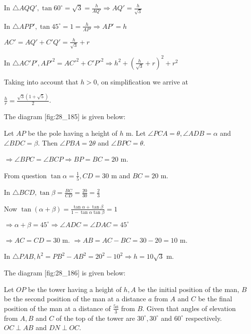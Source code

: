   In $\triangle AQQ', \tan60^\circ = \sqrt{3} = \frac{h}{AQ'} \Rightarrow AQ' = \frac{h}{\sqrt{3}}$

  In $\triangle APP', \tan45^\circ = 1 = \frac{h}{AP'} \Rightarrow AP' = h$

  $AC' = AQ' + C'Q' = \frac{h}{\sqrt{3}} + r$

  In $\triangle AC'P', AP'^2 = AC'^2 + C'P'^2 \Rightarrow h^2 + \left(\frac{h}{\sqrt{3}} +
  r\right)^2 + r^2$

  Taking into account that $h > 0$, on simplification we arrive at

  $\frac{h}{r} = \frac{\sqrt{3}(1 + \sqrt{5})}{2}$.

\item The diagram [fig:28_185] is given below:

  \startplacefigure[reference=fig:28_185]
    \externalfigure[28_185.pdf]
  \stopplacefigure

  Let $AP$ be the pole having a height of $h$ m. Let $\angle PCA = \theta, \angle ADB =
  \alpha$ and $\angle BDC = \beta$. Then $\angle PBA = 2\theta$ and $\angle BPC =
  \theta$.

  $\Rightarrow \angle BPC = \angle BCP \Rightarrow BP = BC = 20$ m.

  From question $\tan\alpha = \frac{1}{5}, CD = 30$ m and $BC = 20$ m.

  In $\triangle BCD, \tan\beta = \frac{BC}{CD} = \frac{20}{30} = \frac{2}{3}$

  Now $\tan(\alpha + \beta) = \frac{\tan\alpha + \tan\beta}{1 - \tan\alpha\tan\beta} = 1$

  $\Rightarrow \alpha + \beta = 45^\circ \Rightarrow \angle ADC = \angle DAC = 45^\circ$

  $\Rightarrow AC = CD = 30$ m. $\Rightarrow AB = AC - BC = 30 - 20 = 10$ m.

  In $\triangle PAB, h^2 = PB^2 - AB^2 = 20^2 - 10^2 \Rightarrow h = 10\sqrt{3}$ m.

\item The diagram [fig:28_186] is given below:

  \startplacefigure[reference=fig:28_186]
    \externalfigure[28_186.pdf]
  \stopplacefigure

  Let $OP$ be the tower having a height of $h, A$ be the initial position of the man,
  $B$ be the second position of the man at a distance $a$ from $A$ and $C$ be the
  final position of the man at a distance of $\frac{5a}{3}$ from $B$. Given that angles of
  elevation from $A, B$ and $C$ of the top of the tower are $30^\circ, 30^\circ$ and
  $60^\circ$ respectively. $OC\perp AB$ and $DN\perp OC$.

